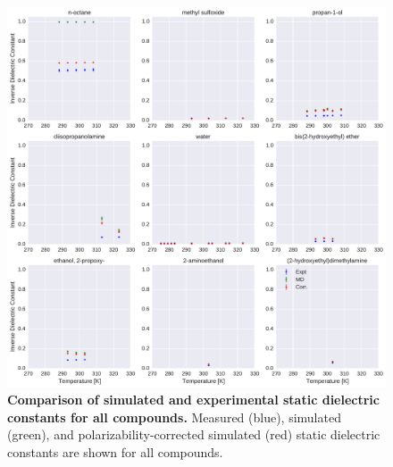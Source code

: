 \documentclass[aip, jcp, reprint]{revtex4-1}  %
\begin{document}
\begin{figure}[alldielectric]

\ContinuedFloat

\includegraphics[width=\textwidth]{./figures/dielectric_versus_temperature_part1.pdf}

\caption{{\bf Comparison of simulated and experimental static dielectric constants for all compounds.}
Measured (blue), simulated (green), and polarizability-corrected simulated (red) static dielectric constants are shown for all compounds.
}

\label{figure:AllDielectrics}

\end{figure}
\end{document}
